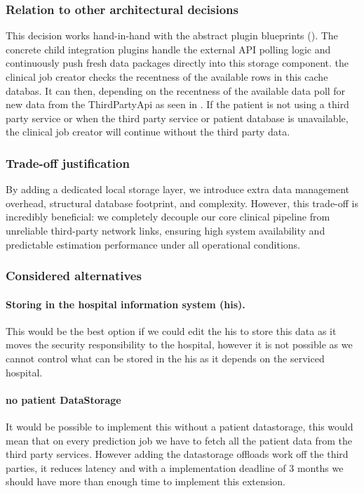 \subsubsection*{Relation to other architectural decisions}
This decision works hand-in-hand with the abstract plugin blueprints (). The concrete child integration plugins handle the external API polling logic and continuously push fresh data packages directly into this storage component. the clinical job creator checks the recentness of the available rows in this cache databas. It can then, depending on the recentness of the available data poll for new data from the ThirdPartyApi as seen in .
If the patient is not using a third party service or when the third party service or patient database is unavailable, the clinical job creator will continue without the third party data.

\subsubsection*{Trade-off justification}
By adding a dedicated local storage layer, we introduce extra data management overhead, structural database footprint, and complexity. However, this trade-off is incredibly beneficial: we completely decouple our core clinical pipeline from unreliable third-party network links, ensuring high system availability and predictable estimation performance under all operational conditions.

\subsubsection*{Considered alternatives}
\paragraph{Storing in the hospital information system (his).}
This would be the best option if we could edit the his to store this data as it moves the security responsibility to the hospital, however it is not possible as we cannot control what can be stored in the his as it depends on the serviced hospital.

\paragraph{no patient DataStorage}
It would be possible to implement this without a patient datastorage, this would mean that on every prediction job we have to fetch all the patient data from the third party services. However adding the datastorage offloads work off the third parties, it reduces latency and with a implementation deadline of 3 months we should have more than enough time to implement this extension.


